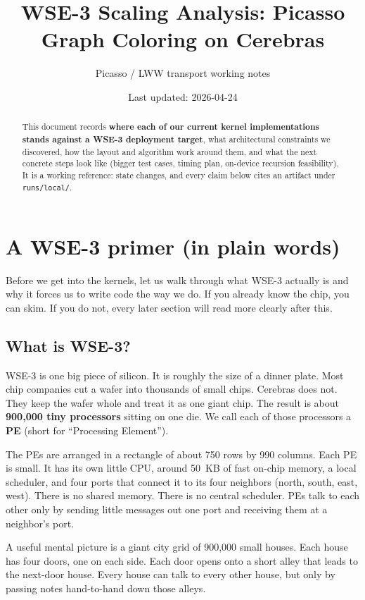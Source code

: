 \documentclass[11pt]{article}
\title{WSE-3 Scaling Analysis: Picasso Graph Coloring on Cerebras}
\author{Picasso / LWW transport working notes}
\date{Last updated: 2026-04-24}
\newcommand{\file}[1]{\texttt{#1}}
\begin{document}
\maketitle

\begin{abstract}
This document records \textbf{where each of our current kernel
implementations stands against a WSE-3 deployment target}, what
architectural constraints we discovered, how the layout and
algorithm work around them, and what the next concrete steps look
like (bigger test cases, timing plan, on-device recursion
feasibility). It is a working reference: state changes, and every
claim below cites an artifact under \file{runs/local/}.
\end{abstract}

\tableofcontents

\section{A WSE-3 primer (in plain words)}

Before we get into the kernels, let us walk through what WSE-3
actually is and why it forces us to write code the way we do. If
you already know the chip, you can skim. If you do not, every
later section will read more clearly after this.

\subsection{What is WSE-3?}

WSE-3 is one big piece of silicon. It is roughly the size of a
dinner plate. Most chip companies cut a wafer into thousands of
small chips. Cerebras does not. They keep the wafer whole and
treat it as one giant chip. The result is about
\textbf{900{,}000 tiny processors} sitting on one die. We call
each of those processors a \textbf{PE} (short for ``Processing
Element'').

The PEs are arranged in a rectangle of about 750 rows by 990
columns. Each PE is small. It has its own little CPU, around
50~KB of fast on-chip memory, a local scheduler, and four ports
that connect it to its four neighbors (north, south, east, west).
There is no shared memory. There is no central scheduler. PEs
talk to each other only by sending little messages out one port
and receiving them at a neighbor's port.

A useful mental picture is a giant city grid of 900{,}000 small
houses. Each house has four doors, one on each side. Each door
opens onto a short alley that leads to the next-door house.
Every house can talk to every other house, but only by passing
notes hand-to-hand down those alleys.
\end{document}
